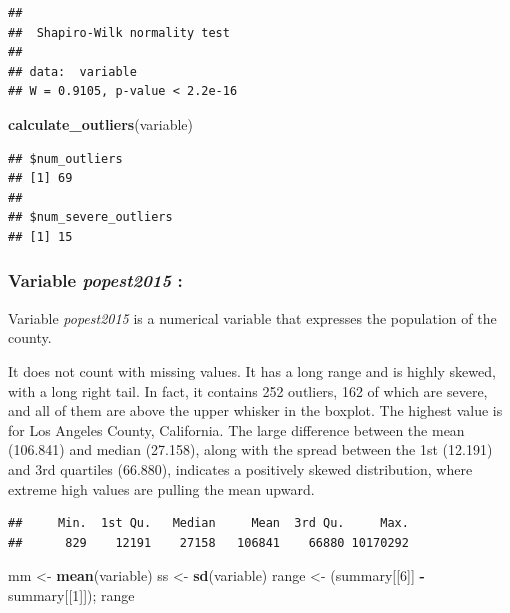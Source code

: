 \documentclass[
]{article}
\newenvironment{Shaded}{\begin{snugshade}}{\end{snugshade}}
\newcommand{\DecValTok}[1]{\textcolor[rgb]{0.00,0.00,0.81}{#1}}
\newcommand{\FunctionTok}[1]{\textcolor[rgb]{0.13,0.29,0.53}{\textbf{#1}}}
\newcommand{\NormalTok}[1]{#1}
\newcommand{\OtherTok}[1]{\textcolor[rgb]{0.56,0.35,0.01}{#1}}
\newcommand{\SpecialCharTok}[1]{\textcolor[rgb]{0.81,0.36,0.00}{\textbf{#1}}}
\begin{document}
\begin{verbatim}
## 
##  Shapiro-Wilk normality test
## 
## data:  variable
## W = 0.9105, p-value < 2.2e-16
\end{verbatim}

\begin{Shaded}
\begin{Highlighting}[]
\FunctionTok{calculate\_outliers}\NormalTok{(variable)}
\end{Highlighting}
\end{Shaded}

\begin{verbatim}
## $num_outliers
## [1] 69
## 
## $num_severe_outliers
## [1] 15
\end{verbatim}

\subsubsection{\texorpdfstring{Variable \emph{popest2015}
:}{Variable popest2015 :}}\label{variable-popest2015}

Variable \emph{popest2015} is a numerical variable that expresses the
population of the county.

It does not count with missing values. It has a long range and is highly
skewed, with a long right tail. In fact, it contains 252 outliers, 162
of which are severe, and all of them are above the upper whisker in the
boxplot. The highest value is for Los Angeles County, California. The
large difference between the mean (106.841) and median (27.158), along
with the spread between the 1st (12.191) and 3rd quartiles (66.880),
indicates a positively skewed distribution, where extreme high values
are pulling the mean upward.

\begin{Shaded}
\end{Shaded}

\begin{verbatim}
##     Min.  1st Qu.   Median     Mean  3rd Qu.     Max. 
##      829    12191    27158   106841    66880 10170292
\end{verbatim}

\begin{Shaded}
\begin{Highlighting}[]
\NormalTok{mm }\OtherTok{\textless{}{-}} \FunctionTok{mean}\NormalTok{(variable)}
\NormalTok{ss }\OtherTok{\textless{}{-}} \FunctionTok{sd}\NormalTok{(variable)}
\NormalTok{range }\OtherTok{\textless{}{-}}\NormalTok{ (summary[[}\DecValTok{6}\NormalTok{]] }\SpecialCharTok{{-}}\NormalTok{ summary[[}\DecValTok{1}\NormalTok{]]); range}
\end{Highlighting}
\end{Shaded}
\end{document}
